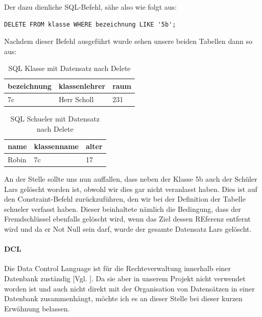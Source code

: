 \documentclass[12pt,a4paper,bibliography=totocnumbered,listof=totocnumbered]{scrartcl}
\begin{document}
\begin{minipage}{\linewidth}
Der dazu dienliche SQL-Befehl, sähe also wie folgt aus:


\vspace{1em}
\begin{lstlisting}[caption= SQL Select Name + Where, label=lst:sql-select-name-where]
DELETE FROM klasse WHERE bezeichnung LIKE '5b';
\end{lstlisting}

Nachdem dieser Befehl ausgeführt wurde sehen unsere beiden Tabellen dann so aus:

\vspace{1em}
\begin{table}[!h]
	\centering
	\begin{tabular}{|l|l|l|}
		\hline
		\textbf{bezeichnung} & \textbf{klassenlehrer} & \textbf{raum}\\
		\hline
		7c & Herr Scholl & 231\\
		
	\end{tabular}
	\caption{SQL Klasse mit Datensatz nach Delete}
	\label{tab:sql-klasse3}
\end{table}

\vspace{1em}
\begin{table}[!h]
	\centering
	\begin{tabular}{|l|l|l|}
		\hline
		\textbf{name} & \textbf{klassenname} & \textbf{alter}\\
		\hline
		Robin & 7c & 17\\
		
	\end{tabular}
	\caption{SQL Schueler mit Datensatz nach Delete}
	\label{tab:sql-schueler4}
\end{table}

An der Stelle sollte uns nun auffallen, dass neben der Klasse 5b auch der Schüler Lars gelöscht worden ist, obwohl wir dies gar nicht veranlasst haben.
Dies ist auf den \glqq Constraint-Befehl\grqq{} zurückzuführen, den wir bei der Definition der Tabelle \glqq schueler\grqq{} verfasst haben.
Dieser beinhaltete nämlich die Bedingung, dass der Fremdschlüssel ebenfalls gelöscht wird, wenn das Ziel dessen REferenz entfernt wird und da er \glqq Not Null\grqq{} sein darf, wurde der gesamte Datensatz Lars gelöscht.

\paragraph{DCL} 
Die \glqq Data Control Language\grqq{} ist für die Rechteverwaltung innerhalb einer Datenbank zuständig [Vgl. \cite{wiki/SQL}].
Da sie aber in unserem Projekt nicht verwendet worden ist und auch nicht direkt mit der Organisation von Datensätzen in einer Datenbank zusammenhängt, möchte ich es an dieser Stelle bei dieser kurzen Erwähnung belassen.  



\end{minipage}
\end{document}
